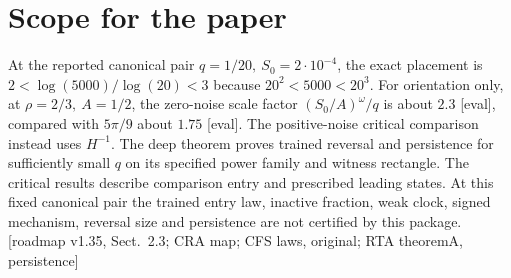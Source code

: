 \documentclass[11pt]{article}
\newcommand{\src}[1]{\textnormal{\small[#1]}}
\begin{document}
\section{Scope for the paper}\label{an04rmsv1:paper}
At the reported canonical pair \(q=1/20,\ S_0=2\cdot10^{-4}\),
the exact placement is \(2<\log(5000)/\log(20)<3\) because
\(20^2<5000<20^3\). For orientation only, at \(\rho=2/3,\ A=1/2\),
the zero-noise scale factor \((S_0/A)^\omega/q\) is about
\(2.3\) [eval], compared with \(5\pi/9\) about \(1.75\) [eval].
The positive-noise critical comparison instead uses \(H^{-1}\).
The deep theorem proves trained reversal and persistence for sufficiently
small \(q\) on its specified power family and witness rectangle.
The critical results describe comparison entry and prescribed leading
states. At this fixed canonical pair the trained entry law, inactive
fraction, weak clock, signed mechanism, reversal size and persistence
are not certified by this package.
\src{roadmap v1.35, Sect.~2.3; CRA map; CFS laws, original; RTA theoremA, persistence}
\end{document}
